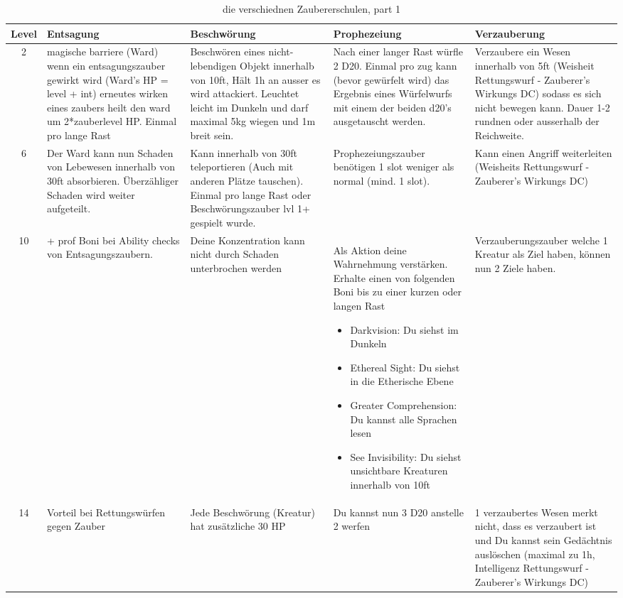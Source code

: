 \begin{table}
	\centering
	\begin{tabular}{cp{6cm}p{6cm}p{6cm}p{6cm}}
	\textbf{Level} & \textbf{Entsagung} & \textbf{Beschwörung} &
	\textbf{Prophezeiung} & \textbf{Verzauberung}\\ \hline	
	2 & magische barriere (Ward) wenn ein entsagungszauber gewirkt wird (Ward's HP = level + int) erneutes wirken eines zaubers heilt den ward um 2*zauberlevel HP. Einmal pro lange Rast
	& Beschwören eines nicht-lebendigen Objekt innerhalb von 10ft, Hält 1h an ausser es wird attackiert. Leuchtet leicht im Dunkeln und darf maximal 5kg wiegen und 1m breit sein.
	& Nach einer langer Rast würfle 2 D20. Einmal pro zug kann (bevor gewürfelt wird) das Ergebnis eines Würfelwurfs mit einem der beiden d20's ausgetauscht werden.
	& Verzaubere ein Wesen innerhalb von 5ft (Weisheit Rettungswurf - Zauberer's Wirkungs DC) sodass es sich nicht bewegen kann. Dauer 1-2 rundnen oder ausserhalb der Reichweite.\\ \hline
	6 & Der Ward kann nun Schaden von Lebewesen innerhalb von 30ft absorbieren. Überzähliger Schaden wird weiter aufgeteilt.
	& Kann innerhalb von 30ft teleportieren (Auch mit anderen Plätze tauschen). Einmal pro lange Rast oder Beschwörungszauber lvl 1+ gespielt wurde.
	& Prophezeiungszauber benötigen 1 slot weniger als normal (mind. 1 slot).
	& Kann einen Angriff weiterleiten (Weisheits Rettungswurf - Zauberer's Wirkungs DC)\\ \hline
	10 & + prof Boni bei Ability checks von Entsagungszaubern.
	& Deine Konzentration kann nicht durch Schaden unterbrochen werden
	& Als Aktion deine Wahrnehmung verstärken. Erhalte einen von folgenden Boni bis zu einer kurzen oder langen Rast
	\begin{itemize}
		\item Darkvision: Du siehst im Dunkeln
		\item Ethereal Sight: Du siehst in die Etherische Ebene
		\item Greater Comprehension: Du kannst alle Sprachen lesen
		\item See Invisibility: Du siehst unsichtbare Kreaturen innerhalb von 10ft
	\end{itemize}
	& Verzauberungszauber welche 1 Kreatur als Ziel haben, können nun 2 Ziele haben.\\ \hline
	14 & Vorteil bei Rettungswürfen gegen Zauber
	& Jede Beschwörung (Kreatur) hat zusätzliche 30 HP
	& Du kannst nun 3 D20 anstelle 2 werfen
	& 1 verzaubertes Wesen merkt nicht, dass es verzaubert ist und Du kannst sein Gedächtnis auslöschen (maximal zu 1h, Intelligenz Rettungswurf - Zauberer's Wirkungs DC) 
	\end{tabular}
	\caption{die verschiednen Zaubererschulen, part 1}
\end{table}
